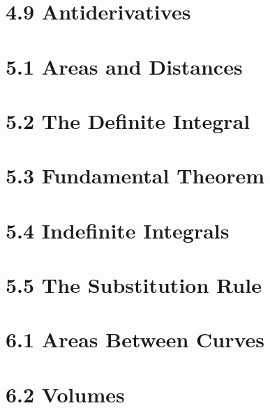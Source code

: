 \documentclass[
	landscape    = true,
	lecture-caps = {1.0, 1.0, 1.0},
	quiz-days    = F,
]{schedule}
\begin{document}
\begin{schedule}
	\section{4.9 Antiderivatives}
	\section{5.1 Areas and Distances}
	\section{5.2 The Definite Integral}
	\section{5.3 Fundamental Theorem}
	\section{5.4 Indefinite Integrals}
	\section{5.5 The Substitution Rule}
	\section{6.1 Areas Between Curves}
	\section{6.2 Volumes}

	\finalreview[2]
	\finalsweek[12-14][5]
	\winterbreak

\end{schedule}
\end{document}
